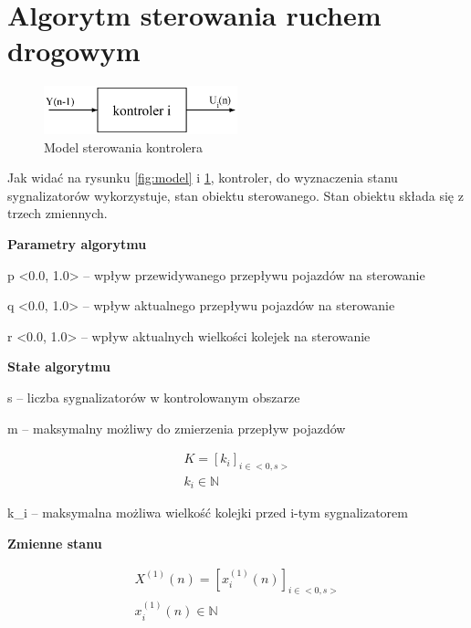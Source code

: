 \section{Algorytm sterowania ruchem drogowym}
\begin{figure}[h]
    \centering
    \includegraphics[width=0.5\textwidth]{images/kontroler.pdf}
    \caption{Model sterowania kontrolera}
    \label{fig:kontroler}
\end{figure}

Jak widać na rysunku \ref{fig:model} i \ref{fig:kontroler}, kontroler, do wyznaczenia stanu sygnalizatorów wykorzystuje, stan obiektu sterowanego. Stan obiektu składa się z trzech zmiennych.

\vspace{1.5cm}
\textbf{Parametry algorytmu}

p \in <0.0, 1.0> \textrm{ -- wpływ przewidywanego przepływu pojazdów na sterowanie}

q \in <0.0, 1.0> \textrm{ -- wpływ aktualnego przepływu pojazdów na sterowanie}

r \in <0.0, 1.0> \textrm{ -- wpływ aktualnych wielkości kolejek na sterowanie}

\vspace{1.5cm}
\textbf{Stałe algorytmu}

s \in {} \textrm{ -- liczba sygnalizatorów w kontrolowanym obszarze}

m \in {} \textrm{ -- maksymalny możliwy do zmierzenia przepływ pojazdów}

\begin{equation}
	\begin{array}{c}
		K = \left[ k_{i} \right]_{i \in <0,s>}\\
		k_{i} \in \mathbb{N}
	\end{array}
\end{equation}

k_{i} \textrm{ -- maksymalna możliwa wielkość kolejki przed i-tym sygnalizatorem}

\vspace{1.5cm}
\textbf{Zmienne stanu}

\begin{equation}
	\begin{array}{c}
		X^{(1)} (n) = \left[ x^{(1)}_{i} (n) \right]_{i \in <0,s>}\\
		x^{(1)}_{i} (n) \in \mathbb{N}
	\end{array}
\end{equation}


